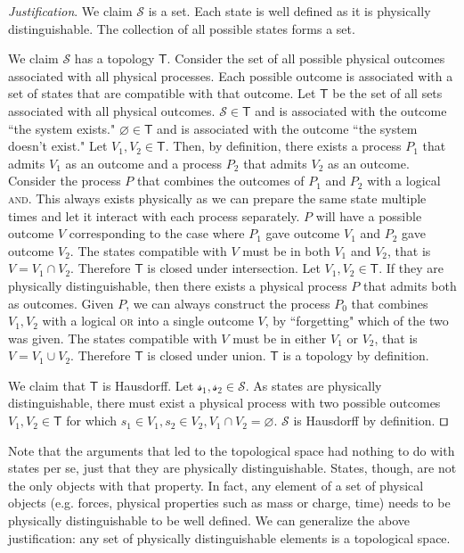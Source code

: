 \documentclass[smallextended]{svjour3}
\numberwithin{equation}{section}
\newenvironment{justification}{\emph{Justification}.}{\hfill\(\qed\)}
\theoremstyle{definition}
\newenvironment{justification}{\emph{Justification}.}{\qed}
\begin{document}
\begin{justification}
We claim $\mathcal{S}$ is a set. Each state is well defined as it is physically distinguishable. The collection of all possible states forms a set.

We claim $\mathcal{S}$ has a topology $\mathsf{T}$. Consider the set of all possible physical outcomes associated with all physical processes. Each possible outcome is associated with a set of states that are compatible with that outcome. Let $\mathsf{T}$ be the set of all sets associated with all physical outcomes. $\mathcal{S} \in \mathsf{T}$ and is associated with the outcome ``the system exists." $\varnothing \in \mathsf{T}$ and is associated with the outcome ``the system doesn't exist." Let $V_1, V_2 \in \mathsf{T}$. Then, by definition, there exists a process $P_1$ that admits $V_1$ as an outcome and a process $P_2$ that admits $V_2$ as an outcome. Consider the process $P$ that combines the outcomes of $P_1$ and $P_2$ with a logical \textsc{and}. This always exists physically as we can prepare the same state multiple times and let it interact with each process separately. $P$ will have a possible outcome $V$ corresponding to the case where $P_1$ gave outcome $V_1$ and $P_2$ gave outcome $V_2$. The states compatible with $V$ must be in both $V_1$ and $V_2$, that is $V = V_1 \cap V_2$. Therefore $\mathsf{T}$ is closed under intersection. Let $V_1, V_2 \in \mathsf{T}$. If they are physically distinguishable, then there exists a physical process $P$ that admits both as outcomes. Given $P$, we can always construct the process $P_0$ that combines $V_1, V_2$ with a logical \textsc{or} into a single outcome $V$, by ``forgetting" which of the two was given. The states compatible with $V$ must be in either $V_1$ or $V_2$, that is $V = V_1 \cup V_2$. Therefore $\mathsf{T}$ is closed under union. $\mathsf{T}$ is a topology by definition.

We claim that $\mathsf{T}$ is Hausdorff. Let $\mathcal{s_1}, \mathcal{s_2} \in \mathcal{S}$. As states are physically distinguishable, there must exist a physical process with two possible outcomes $V_1, V_2 \in \mathsf{T}$ for which $s_1 \in V_1, s_2 \in V_2, V_1 \cap V_2 = \varnothing$. $\mathcal{S}$ is Hausdorff by definition.
\end{justification}

Note that the arguments that led to the topological space had nothing to do with states per se, just that they are physically distinguishable. States, though, are not the only objects with that property. In fact, any element of a set of physical objects (e.g. forces, physical properties such as mass or charge, time) needs to be physically distinguishable to be well defined. We can generalize the above justification: any set of physically distinguishable elements is a topological space.
\end{document}
